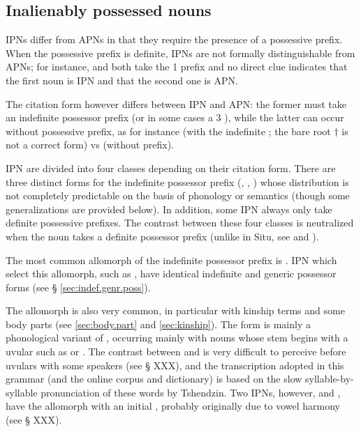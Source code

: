 \subsection{Inalienably possessed nouns} \label{sec:inalienably.possessed}
IPNs differ from APNs in that they require the presence of a possessive prefix.  When the possessive prefix is definite, IPNs are not formally distinguishable from APNs; for instance,  and  both take the 1\sg{}  prefix and no direct clue indicates that the first noun is IPN and that the second one is APN.

The citation form however differs between IPN and APN: the former must take an indefinite possessor prefix (or in some cases a 3\sg{} ), while the latter can occur without possessive prefix, as for instance  (with the indefinite ; the bare root $\dagger$ is not a correct form) vs  (without prefix).

IPN are divided into four classes depending on their citation form. There are three distinct forms for the indefinite possessor prefix (, , ) whose distribution is not completely predictable on the basis of phonology or semantics (though some generalizations are provided below). In addition, some IPN always only take definite possessive prefixes. The contrast between these four classes is neutralized when the noun takes a definite possessor prefix (unlike in Situ, see \citealt[168-169]{linxr93jiarongen} and \citealt[118-119]{prins16kyomkyo}).

The most common allomorph of the indefinite possessor prefix is . IPN which select this allomorph, such as , have identical indefinite and generic possessor forms (see § \ref{sec:indef.genr.poss}).

The allomorph  is also very common, in particular with kinship terms and some body parts (see \ref{sec:body.part} and \ref{sec:kinship}). The form  is mainly a phonological variant of , occurring mainly with nouns whose stem begins with a uvular such as  or . The contrast between  and  is very difficult to perceive before uvulars with some speakers (see § XXX), and the transcription adopted in this grammar (and the online corpus and dictionary) is based on the slow syllable-by-syllable pronunciation of these words by Tshendzin. Two IPNs, however,  and , have the  allomorph with an initial , probably originally due to vowel harmony (see § XXX).

